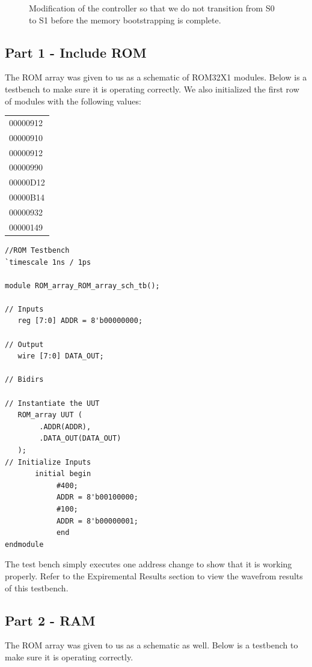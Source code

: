 \documentclass[12pt]{article}
\begin{document}
		\begin{figure}[h]
			\caption{Modification of the controller so that we do not transition from S0 to S1 before the memory bootstrapping is complete.}
		\end{figure}
		
		\newpage
	\subsection{Part 1 - Include ROM}
	The ROM array was given to us as a schematic of ROM32X1 modules. Below is a testbench to make sure it is operating correctly. We also initialized the first row of modules with the following values:

\begin{flushleft}
\begin{tabular}{|l|}
\hline
00000912 \\
00000910 \\
00000912 \\
00000990 \\
00000D12 \\
00000B14 \\
00000932 \\
00000149 \\
\hline
\end{tabular}
\end{flushleft}

		
		\begin{Verbatim}[frame=single, fontsize= \small]
//ROM Testbench
`timescale 1ns / 1ps

module ROM_array_ROM_array_sch_tb();

// Inputs
   reg [7:0] ADDR = 8'b00000000;

// Output
   wire [7:0] DATA_OUT;

// Bidirs

// Instantiate the UUT
   ROM_array UUT (
		.ADDR(ADDR), 
		.DATA_OUT(DATA_OUT)
   );
// Initialize Inputs
       initial begin
			#400;
			ADDR = 8'b00100000;
			#100;
			ADDR = 8'b00000001;
			end
endmodule

		\end{Verbatim}
		The test bench simply executes one address change to show that it is working properly. Refer to the Expiremental Results section to view the wavefrom results of this testbench.
		\newpage
		\subsection{Part 2 - RAM}
		The ROM array was given to us as a schematic as well. Below is a testbench to make sure it is operating correctly.
\end{document}
